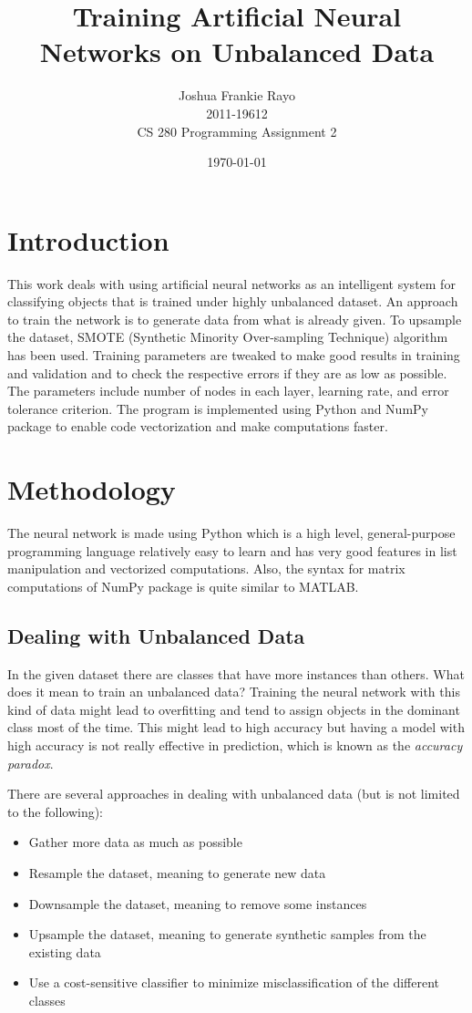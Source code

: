 \documentclass{article}
\title{Training Artificial Neural Networks on Unbalanced Data}
\author{Joshua Frankie Rayo\\2011-19612\\CS 280 Programming Assignment 2}
\date{\today}
\begin{document}
\maketitle
\tableofcontents

\section{Introduction}
	This work deals with using artificial neural networks as an intelligent system for classifying objects that is trained under highly unbalanced dataset. An approach to train the network is to generate data from what is already given. To upsample the dataset, SMOTE (Synthetic Minority Over-sampling Technique) algorithm has been used. Training parameters are tweaked to make good results in training and validation and to check the respective errors if they are as low as possible. The parameters include number of nodes in each layer, learning rate, and error tolerance criterion. The program is implemented using Python and NumPy package to enable code vectorization and make computations faster.

\section{Methodology}
The neural network is made using Python which is a high level, general-purpose programming language relatively easy to learn and has very good features in list manipulation and vectorized computations. Also, the syntax for matrix computations of NumPy package is quite similar to MATLAB\cite{bib:mat}.

\subsection{Dealing with Unbalanced Data}
In the given dataset there are classes that have more instances than others. What does it mean to train an unbalanced data? Training the neural network with this kind of data might lead to overfitting and tend to assign objects in the dominant class most of the time\cite{bib:imb}. This might lead to high accuracy but having a model with high accuracy is not really effective in prediction, which is known as the \textit{accuracy paradox}\cite{bib:acp}.

There are several approaches in dealing with unbalanced data\cite{bib:unb} (but is not limited to the following):
\begin{itemize}
	\item Gather more data as much as possible
	\item Resample the dataset, meaning to generate new data
	\item Downsample the dataset, meaning to remove some instances
	\item Upsample the dataset, meaning to generate synthetic samples from the existing data
	\item Use a cost-sensitive classifier to minimize misclassification of the different classes
\end{itemize}
\end{document}
